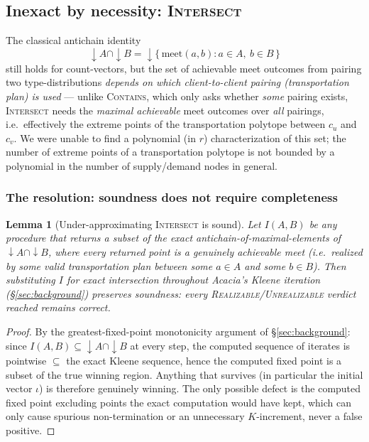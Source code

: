 \documentclass[11pt]{article}
\newtheorem{lemma}{Lemma}
\newcommand{\down}[1]{{\downarrow}#1}
\begin{document}
\subsection{Inexact by necessity: \textsc{Intersect}}
\label{sec:intersect}

The classical antichain identity
\[
  \down{A} \cap \down{B} = \down{\{\, \mathrm{meet}(a,b) : a \in A,\ b \in B \,\}}
\]
still holds for count-vectors, but the set of achievable meet outcomes
from pairing two type-distributions \emph{depends on which
client-to-client pairing (transportation plan) is used} --- unlike
\textsc{Contains}, which only asks whether \emph{some} pairing exists,
\textsc{Intersect} needs the \emph{maximal achievable} meet outcomes over
\emph{all} pairings, i.e.\ effectively the extreme points of the
transportation polytope between $c_u$ and $c_v$. We were unable to find a
polynomial (in $r$) characterization of this set; the number of extreme
points of a transportation polytope is not bounded by a polynomial in the
number of supply/demand nodes in general.

\subsubsection{The resolution: soundness does not require completeness}

\begin{lemma}[Under-approximating \textsc{Intersect} is sound]
\label{lem:intersect-sound}
Let $I(A,B)$ be any procedure that returns a subset of the exact
antichain-of-maximal-elements of $\down A \cap \down B$, where every
returned point is a genuinely achievable meet (i.e.\ realized by some
valid transportation plan between some $a\in A$ and some $b\in B$). Then
substituting $I$ for exact intersection throughout Acacia's Kleene
iteration (\S\ref{sec:background}) preserves soundness: every
\textsc{Realizable}/\textsc{Unrealizable} verdict reached remains correct.
\end{lemma}

\begin{proof}
By the greatest-fixed-point monotonicity argument of
\S\ref{sec:background}: since $I(A,B) \subseteq \down A \cap \down B$ at
every step, the computed sequence of iterates is pointwise $\subseteq$ the
exact Kleene sequence, hence the computed fixed point is a subset of the
true winning region. Anything that survives (in particular the initial
vector $\iota$) is therefore genuinely winning. The only possible defect
is the computed fixed point excluding points the exact computation would
have kept, which can only cause spurious non-termination or an
unnecessary $K$-increment, never a false positive.
\end{proof}
\end{document}
